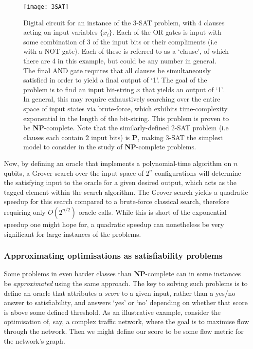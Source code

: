 \begin{figure}[!htb]
\texttt{[image: 3SAT]}
\caption{Digital circuit for an instance of the 3-\textsc{SAT} problem, with 4 clauses acting on input variables $\{x_i\}$. Each of the OR gates is input with some combination of 3 of the input bits or their compliments (i.e with a NOT gate). Each of these is referred to as a `clause', of which there are 4 in this example, but could be any number in general. The final AND gate requires that all clauses be simultaneously satisfied in order to yield a final output of `1'. The goal of the problem is to find an input bit-string $x$ that yields an output of `1'. In general, this may require exhaustively searching over the entire space of input states via brute-force, which exhibits time-complexity exponential in the length of the bit-string. This problem is proven to be \textbf{NP}-complete. Note that the similarly-defined 2-\textsc{SAT} problem (i.e clauses each contain 2 input bits) is \textbf{P}, making 3-\textsc{SAT} the simplest model to consider in the study of \textbf{NP}-complete problems.} \label{fig:3SAT}	
\end{figure}

Now, by defining an oracle that implements a polynomial-time algorithm on $n$ qubits, a Grover search over the input space of $2^n$ configurations will determine the satisfying input to the oracle for a given desired output, which acts as the tagged element within the search algorithm. The Grover search yields a quadratic speedup for this search compared to a brute-force classical search, therefore requiring only $O(2^{n/2})$ oracle calls. While this is short of the exponential speedup one might hope for, a quadratic speedup can nonetheless be very significant for large instances of the problems.

\subsubsection{Approximating optimisations as satisfiability problems}

Some problems in even harder classes than \textbf{NP}-complete can in some instances be \textit{approximated} using the same approach. The key to solving such problems is to define an oracle that attributes a \textit{score} to a given input, rather than a yes/no answer to satisfiability, and answers `yes' or `no' depending on whether that score is above some defined threshold. As an illustrative example, consider the optimisation of, say, a complex traffic network, where the goal is to maximise flow through the network. Then we might define our score to be some flow metric for the network's graph.

